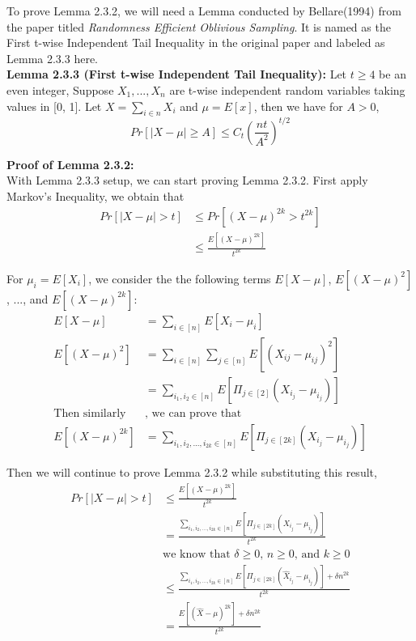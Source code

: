 \documentclass[a4paper, english]{paper}
\begin{document}
 To prove Lemma 2.3.2, we will need a Lemma conducted by Bellare(1994) from the paper titled \textit{Randomness Efficient Oblivious Sampling}. It is named as the First t-wise Independent Tail Inequality in the original paper and labeled as Lemma 2.3.3 here. \\

	\noindent\textbf{Lemma 2.3.3 (First t-wise Independent Tail Inequality):} Let $t \ge 4$ be an even integer, Suppose $X_1, ..., X_n$ are t-wise independent random variables taking values in [0, 1]. Let $X = \sum_{i \in n} X_i$ and $\mu = E[x]$, then we have for $A > 0$,
	$$Pr[|X-\mu| \ge A] \le C_t (\frac{nt}{A^2})^{t/2}$$

	 \noindent\textbf{Proof of Lemma 2.3.2:}\\ With Lemma 2.3.3 setup, we can start proving Lemma 2.3.2. First apply Markov's Inequality, we obtain that
	 \begin{align*}
	 	Pr\left[|X - \mu| > t\right]  &\le Pr\left[\left(X - \mu\right)^{2k} > t^{2k}\right]\\
	 	& \le \frac{E[(X-\mu)^{2k}]}{t^{2k}}
	\end{align*}\par
	For $\mu_i = E[X_i]$, we consider the the following terms $E[X-\mu]$, $E[(X-\mu)^2]$, ..., and $E[(X-\mu)^{2k}]$:
	\begin{align*}
		E[X-\mu] &=\sum_{i\in[n]} E[X_i - \mu_i] \\
		E[(X-\mu)^2]  &= \sum_{i \in [n]} \sum_{j \in [n]} E[(X_{ij} - \mu_{ij})^2] \\
		&=\sum_{i_1, i_2 \in [n]} E[\Pi_{j \in [2]}(X_{i_j}-\mu_{i_j})] \\
		 \text{Then similarly} & \text{, we can prove that } \\
		E[(X-\mu)^{2k}] &= \sum_{i_1, i_2, ..., i_{2k} \in [n]} E[\Pi_{j \in [2k]}(X_{i_j}-\mu_{i_j})]
	\end{align*}\par
	Then we will continue to prove Lemma 2.3.2 while substituting this result,
	\begin{align*}
	 	Pr\left[|X - \mu| > t\right]  & \le \frac{E[(X-\mu)^{2k}]}{t^{2k}} \\
		&= \frac{\sum_{i_1, i_2, ..., i_{2k} \in [n]} E[\Pi_{j \in [2k]}(X_{i_j}-\mu_{i_j})]}{t^{2k}} \\
		& \text{we know that $\delta \ge 0$, $n \ge 0$, and $k \ge 0$} \\
		& \le \frac{\sum_{i_1, i_2, ..., i_{2k} \in [n]} E[\Pi_{j \in [2k]}(\hat{X}_{i_j}-\mu_{i_j})] + \delta n^{2k}}{t^{2k}} \\
		& = \frac{E[(\hat{X}-\mu)^{2k}] + \delta n^{2k}}{t^{2k}}
	 \end{align*}\par
\end{document}
